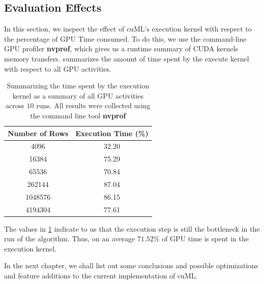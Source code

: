 \subsection{Evaluation Effects}
\label{sec:evaleffects}
In this section, we inspect the effect of cuML's execution kernel with respect to the percentage of GPU Time consumed. To do this, we use the command-line GPU profiler \textbf{nvprof}, which gives us a runtime summary of CUDA kernels memory transfers.  summarizes the amount of time spent by the execute kernel with respect to all GPU activities. 

\begin{table}[htbp]
  \caption{Summarizing the time spent by the execution kernel as a summary of all GPU activities across $10$ runs. All results were collected using the command line tool \textbf{nvprof}}
  \begin{center}
    \begin{tabular}[c]{cc}
      \toprule
      \textbf{Number of Rows} & \textbf{Execution Time (\%)} \\
      \midrule
      4096    & 32.20\\
      16384   & 75.29\\
      65536   & 70.84\\
      262144  & 87.04\\ 
      1048576 & 86.15\\
      4194304 & 77.61\\
      \bottomrule
    \end{tabular}
    \label{tab:nvprofexec}
  \end{center}
\end{table}

The values in \cref*{tab:nvprofexec} indicate to us that the execution step is still the bottleneck in the run of the algorithm. Thus, on an average $71.52\%$ of GPU time is spent in the execution kernel.

In the next chapter, we shall list out some conclusions and possible optimizations and feature additions to the current implementation of cuML. 
